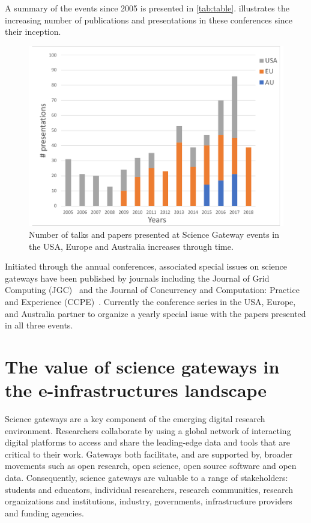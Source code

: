 \documentclass[review]{elsarticle}
\begin{document}
A summary of the events since 2005 is presented in \cref{tab:table}.  illustrates the increasing number of publications and presentations in these conferences since their inception.

\begin{figure}[t]
	\includegraphics[width=0.7\linewidth]{graph}
	\centering
	\caption{Number of talks and papers presented at Science Gateway events in the USA, Europe and Australia increases through time.}
	\label{fig:graph}
\end{figure}


Initiated through the annual conferences, associated special issues on science gateways have been published by journals including the Journal of
Grid Computing (JGC)~\cite{jgc2012,jgc2015-29} and the Journal of Concurrency and Computation: Practice
and Experience (CCPE)~\cite{ccpe2005,ccpe2007,ccpe2011,ccpe2013, ccpe2013-28,ccpe2014-27,ccpe2015}. 
Currently the conference series in the USA, Europe, and Australia partner to organize a yearly special issue with the papers presented in all three events.




\section{The value of science gateways in the e-infrastructures landscape}

Science gateways are a key component of the emerging digital research environment. Researchers collaborate by using a global network of interacting digital platforms to access and share the leading-edge data and tools that are critical to their work. Gateways both facilitate, and are supported by, broader movements such as open research, open science, open source software and open data. Consequently, science gateways are valuable to a range of stakeholders: students and educators, individual researchers, research communities, research organizations and institutions, industry, governments, infrastructure providers and funding agencies.
\end{document}
